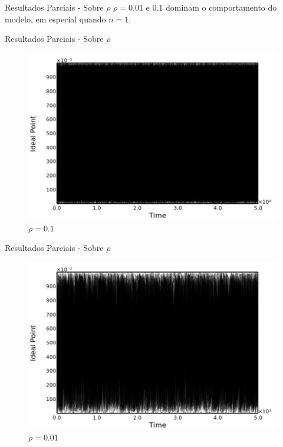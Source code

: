 \documentclass{beamer}
\begin{document}
\begin{frame}{Resultados Parciais - Sobre \(\rho\)}
   \(\rho = 0.01 \) e \(0.1 \) dominam o comportamento do modelo, em especial
   quando \(n = 1\).
   
\end{frame}




\begin{frame}{Resultados Parciais - Sobre \(\rho\)}
  
  \begin{figure}[H]
    \centering
    \includegraphics[scale = 0.5]{ims/rho01.pdf}
    \caption{\(\rho = 0.1\)}
  \end{figure}
\end{frame}


\begin{frame}{Resultados Parciais - Sobre \(\rho\)}
  
  \begin{figure}[H]
    \centering
    \includegraphics[scale = 0.5]{ims/rho001.pdf}
    \caption{\(\rho = 0.01\)}
  \end{figure}
\end{frame}
\end{document}
